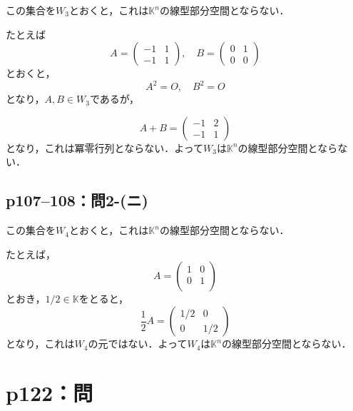 \documentclass[a4paper,10pt,fleqn]{ltjsarticle}
\begin{document}
\begin{tleftbar}
  この集合を$W_3$とおくと，これは$\mathbb{K}^n$の線型部分空間とならない．

  たとえば
  \[
    A = \begin{pmatrix} -1 & 1 \\ -1 & 1 \end{pmatrix} , \quad B = \begin{pmatrix} 0 & 1 \\ 0 & 0 \end{pmatrix}
  \]
  とおくと，
  \[
    A^2 = O , \quad B^2 =O
  \]
  となり，$A ,B \in W_3$であるが，

  \[
    A+B = \begin{pmatrix} -1 & 2\\-1 & 1\end{pmatrix}
  \]
  となり，これは冪零行列とならない．よって$W_3$は$\mathbb{K}^n$の線型部分空間とならない．
\end{tleftbar}

\subsection*{p107--108：問2-(ニ)}

\begin{tleftbar}
  この集合を$W_4$とおくと，これは$\mathbb{K}^n$の線型部分空間とならない．

  たとえば，
  \[
    A= \begin{pmatrix} 1 & 0 \\ 0 & 1 \\ \end{pmatrix}
  \]
  とおき，$ 1/2 \in \mathbb{K}$をとると，
  \[
    \frac{1}{2} A = \begin{pmatrix} 1/2 & 0 \\ 0 & 1/2 \end{pmatrix}
  \]
  となり，これは$W_4$の元ではない．よって$W_4$は$\mathbb{K}^n$の線型部分空間とならない．
\end{tleftbar}
\newpage

\section*{p122：問}
\end{document}

